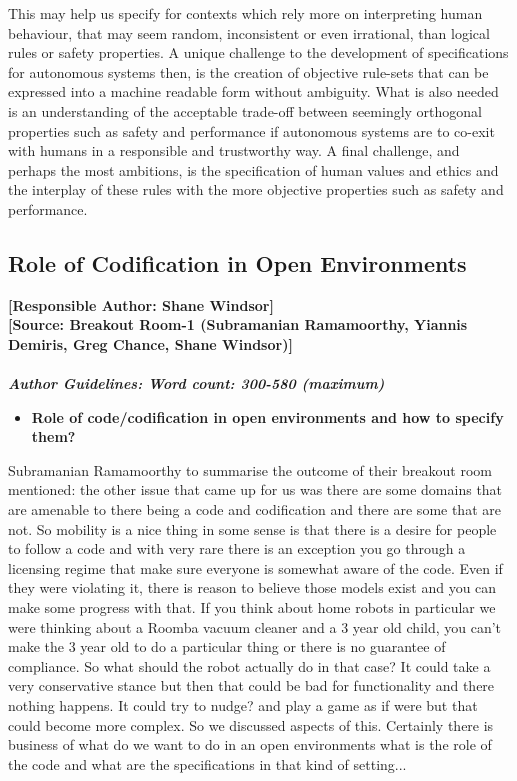 \documentclass[sigconf]{acmart}
\begin{document}
%
This may help us specify for contexts which rely more on interpreting human behaviour, that may seem random, inconsistent or even irrational, than logical rules or safety properties. 
%
A unique challenge to the development of specifications for autonomous systems then, is the creation of objective rule-sets that can be expressed into a machine readable form without ambiguity. What is also needed is an understanding of the acceptable trade-off between seemingly orthogonal properties such as safety and performance if autonomous systems are to co-exit with humans in a responsible and trustworthy way. 
%
A final challenge, and perhaps the most ambitions, is the specification of human values and ethics and the interplay of these rules with the more objective properties such as safety and performance. 






\subsection{Role of Codification in Open Environments}
\noindent\textbf{[Responsible Author:  Shane Windsor]}\\
\noindent \textbf{[Source: Breakout Room-1 (Subramanian Ramamoorthy, Yiannis Demiris, Greg Chance, Shane Windsor)]}\\\\
\noindent\textbf{\textit{Author Guidelines: Word count: 300-580 (maximum)}}\\
\begin{itemize}
	\item \textbf{Role of code/codification in open environments and how to specify them?}
\end{itemize}
Subramanian Ramamoorthy to summarise the outcome of their breakout room mentioned: the other issue that came up for us was there are some domains that are amenable to there being a code and codification and there are some that are not. So mobility is a nice thing in some sense is that there is a desire for people to follow a code and with very rare there is an exception you go through a licensing regime that make sure everyone is somewhat aware of the code. Even if they were violating it, there is reason to believe those models exist and you can make some progress with that.
If you think about home robots in particular we were thinking about a Roomba vacuum cleaner and a  3 year old child, you can't make the 3 year old to do a particular thing or there is no guarantee of compliance. So what should the robot actually do in that case? It could take a very conservative stance but then that could be bad for functionality and there nothing happens.
It could try to nudge? and play a game as if were but that could become more complex.
So we discussed aspects of this. 
Certainly there is business of what do we want to do in an open environments what is the role of the code and what are the specifications in that kind of setting... 
\end{document}
